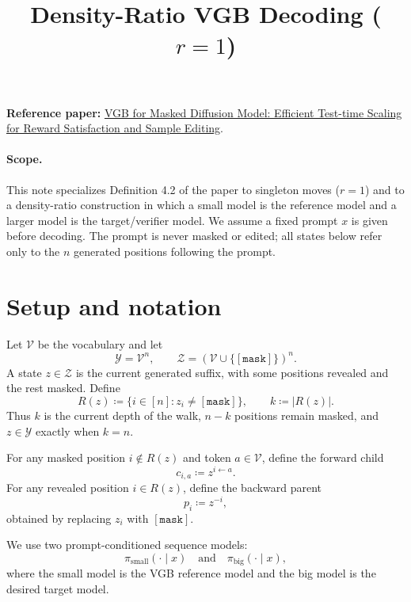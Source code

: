 \documentclass[11pt]{article}
\title{Density-Ratio VGB Decoding ($r=1$)}
\author{}
\date{}
\newcommand{\pb}{\pi_{\mathrm{big}}}
\newcommand{\ps}{\pi_{\mathrm{small}}}
\newcommand{\Vocab}{\mathcal{V}}
\newcommand{\Y}{\mathcal{Y}}
\newcommand{\Z}{\mathcal{Z}}
\newcommand{\R}{R}
\newcommand{\mask}{\mathtt{[mask]}}
\begin{document}
\maketitle

\noindent\textbf{Reference paper:}
\href{https://arxiv.org/pdf/2606.28301}{VGB for Masked Diffusion Model: Efficient Test-time Scaling for Reward Satisfaction and Sample Editing}.

\paragraph{Scope.}
This note specializes Definition 4.2 of the paper to singleton moves ($r=1$) and to a density-ratio construction in which a small model is the reference model and a larger model is the target/verifier model. We assume a fixed prompt $x$ is given before decoding. The prompt is never masked or edited; all states below refer only to the $n$ generated positions following the prompt.

\section{Setup and notation}

Let $\Vocab$ be the vocabulary and let
\begin{equation}
\Y = \Vocab^n,
\qquad
\Z = (\Vocab\cup\{\mask\})^n.
\end{equation}
A state $z\in\Z$ is the current generated suffix, with some positions revealed and the rest masked. Define
\begin{equation}
\R(z) \coloneqq \{i\in[n]: z_i\neq\mask\},
\qquad
k \coloneqq |\R(z)|.
\end{equation}
Thus $k$ is the current depth of the walk, $n-k$ positions remain masked, and $z\in\Y$ exactly when $k=n$.

For any masked position $i\notin\R(z)$ and token $a\in\Vocab$, define the forward child
\begin{equation}
c_{i,a} \coloneqq z^{i\leftarrow a}.
\end{equation}
For any revealed position $i\in\R(z)$, define the backward parent
\begin{equation}
p_i \coloneqq z^{-i},
\end{equation}
obtained by replacing $z_i$ with $\mask$.

We use two prompt-conditioned sequence models:
\begin{equation}
\ps(\cdot\mid x)
\quad\text{and}\quad
\pb(\cdot\mid x),
\end{equation}
where the small model is the VGB reference model and the big model is the desired target model.
\end{document}
